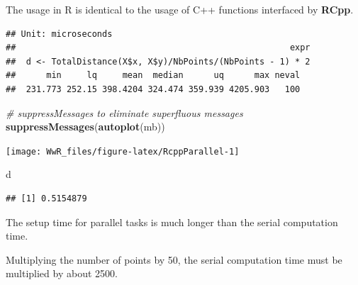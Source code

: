 \documentclass[
  12pt,
  american,
  a4paper,
  extrafontsizes,onecolumn,openright
  ]{memoir}
\newenvironment{Shaded}{\begin{snugshade}}{\end{snugshade}}
\newcommand{\CommentTok}[1]{\textcolor[rgb]{0.56,0.35,0.01}{\textit{#1}}}
\newcommand{\DecValTok}[1]{\textcolor[rgb]{0.00,0.00,0.81}{#1}}
\newcommand{\FunctionTok}[1]{\textcolor[rgb]{0.13,0.29,0.53}{\textbf{#1}}}
\newcommand{\NormalTok}[1]{#1}
\newcommand{\OtherTok}[1]{\textcolor[rgb]{0.56,0.35,0.01}{#1}}
\newcommand{\SpecialCharTok}[1]{\textcolor[rgb]{0.81,0.36,0.00}{\textbf{#1}}}
\newlength{\rf}
\begin{document}
\normalsize

The usage in R is identical to the usage of C++ functions interfaced by \textbf{RCpp}.

\scriptsize

\begin{Shaded}
\end{Shaded}

\begin{verbatim}
## Unit: microseconds
##                                                      expr
##  d <- TotalDistance(X$x, X$y)/NbPoints/(NbPoints - 1) * 2
##      min     lq     mean  median      uq      max neval
##  231.773 252.15 398.4204 324.474 359.939 4205.903   100
\end{verbatim}

\begin{Shaded}
\begin{Highlighting}[]
\CommentTok{\# suppressMessages to eliminate superfluous messages}
\FunctionTok{suppressMessages}\NormalTok{(}\FunctionTok{autoplot}\NormalTok{(mb))}
\end{Highlighting}
\end{Shaded}

\begin{center}\texttt{[image: WwR\_files/figure-latex/RcppParallel-1]} \end{center}

\begin{Shaded}
\begin{Highlighting}[]
\NormalTok{d}
\end{Highlighting}
\end{Shaded}

\begin{verbatim}
## [1] 0.5154879
\end{verbatim}

\normalsize

The setup time for parallel tasks is much longer than the serial computation time.

Multiplying the number of points by 50, the serial computation time must be multiplied by about 2500.
\end{document}
